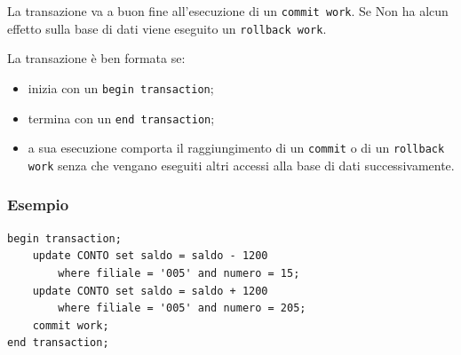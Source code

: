 \documentclass[oneside,a4paper,11pt]{book}
\theoremstyle{italicstyle}
\theoremstyle{normStyle}
\begin{document}
La transazione va a buon fine all'esecuzione di un \verb|commit work|. Se 
Non ha alcun effetto sulla base di dati viene eseguito un \verb|rollback work|.

La transazione è ben formata se:
\begin{itemize}
    \item inizia con un \verb|begin transaction|;
    \item termina con un \verb|end transaction|;
    \item a sua esecuzione comporta il raggiungimento 
di un \verb|commit| o di un \verb|rollback work| senza che vengano eseguiti 
altri accessi alla base di dati successivamente. 
\end{itemize}
\subsubsection{Esempio}
\begin{lstlisting}
begin transaction;
    update CONTO set saldo = saldo - 1200
        where filiale = '005' and numero = 15;
    update CONTO set saldo = saldo + 1200
        where filiale = '005' and numero = 205;
    commit work;
end transaction;
\end{lstlisting}
\end{document}
